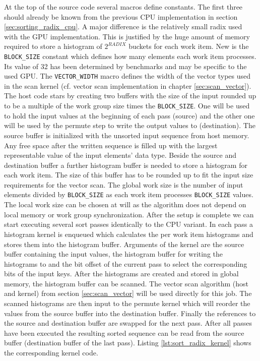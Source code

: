 

At the top of the source code several macros define constants. The first three should already be known from the previous CPU implementation in section \ref{sec:sorting_radix_cpu}. A major difference is the relatively small radix used with the GPU implementation. This is justified by the huge amount of memory required to store a histogram of $2^{RADIX}$ buckets for each work item. New is the \lstinline!BLOCK_SIZE! constant which defines how many elements each work item processes. Its value of 32 has been determined by benchmarks and may be specific to the used GPU. The \lstinline!VECTOR_WIDTH! macro defines the width of the vector types used in the scan kernel (cf. vector scan implementation in chapter \ref{sec:scan_vector}). 
The host code stars by creating two buffers with the size of the input rounded up to be a multiple of the work group size times the \lstinline!BLOCK_SIZE!. One will be used to hold the input values at the beginning of each pass (source) and the other one will be used by the permute step to write the output values to (destination). The source buffer is initialized with the unsorted input sequence from host memory. Any free space after the written sequence is filled up with the largest representable value of the input elements' data type.
Beside the source and destination buffer a further histogram buffer is needed to store a histogram for each work item. The size of this buffer has to be rounded up to fit the input size requirements for the vector scan. 
The global work size is the number of input elements divided by \lstinline!BLOCK_SIZE! as each work item processes \lstinline!BLOCK_SIZE! values. The local work size can be chosen at will as the algorithm does not depend on local memory or work group synchronization.
After the setup is complete we can start executing several sort passes identically to the CPU variant. In each pass a histogram kernel is enqueued which calculates the per work item histograms and stores them into the histogram buffer. Arguments of the kernel are the source buffer containing the input values, the histogram buffer for writing the histograms to and the bit offset of the current pass to select the corresponding bits of the input keys. After the histograms are created and stored in global memory, the histogram buffer can be scanned. The vector scan algorithm (host and kernel) from section \ref{sec:scan_vector} will be used directly for this job. The scanned histograms are then input to the permute kernel which will reorder the values from the source buffer into the destination buffer. Finally the references to the source and destination buffer are swapped for the next pass.
After all passes have been executed the resulting sorted sequence can be read from the source buffer (destination buffer of the last pass).
Listing \ref{lst:sort_radix_kernel} shows the corresponding kernel code.

